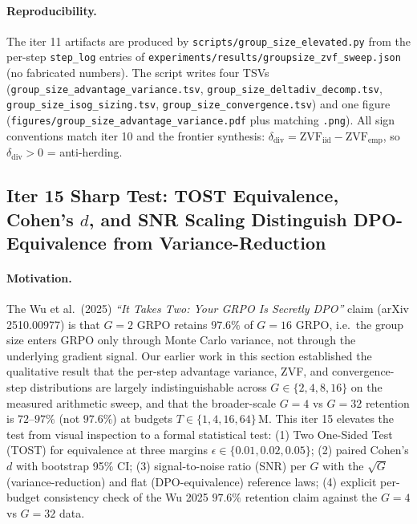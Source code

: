 \paragraph{Reproducibility.}
The iter 11 artifacts are produced by
\texttt{scripts/group\_size\_elevated.py} from the per-step
\texttt{step\_log} entries of
\texttt{experiments/results/groupsize\_zvf\_sweep.json} (no
fabricated numbers). The script writes four TSVs
(\texttt{group\_size\_advantage\_variance.tsv},
\texttt{group\_size\_deltadiv\_decomp.tsv},
\texttt{group\_size\_isog\_sizing.tsv},
\texttt{group\_size\_convergence.tsv}) and one figure
(\texttt{figures/group\_size\_advantage\_variance.pdf} plus matching
\texttt{.png}). All sign conventions match iter 10 and the frontier
synthesis: $\delta_\text{div} = \mathrm{ZVF}_\text{iid} -
\mathrm{ZVF}_\text{emp}$, so $\delta_\text{div} > 0$ = anti-herding.



\subsection{Iter 15 Sharp Test: TOST Equivalence, Cohen's $d$, and
SNR Scaling Distinguish DPO-Equivalence from Variance-Reduction}

\paragraph{Motivation.}
The Wu et al.\ (2025) \emph{``It Takes Two: Your GRPO Is Secretly DPO''}
claim (arXiv 2510.00977) is that $G{=}2$ GRPO retains $97.6\%$ of
$G{=}16$ GRPO, i.e.\ the group size enters GRPO only through Monte
Carlo variance, not through the underlying gradient signal. Our
earlier work in this section established the qualitative result that
the per-step advantage variance, ZVF, and convergence-step
distributions are largely indistinguishable across $G \in
\{2,4,8,16\}$ on the measured arithmetic sweep, and that the
broader-scale $G{=}4$ vs $G{=}32$ retention is $72$--$97\%$ (not
$97.6\%$) at budgets $T \in \{1,4,16,64\}$\,M. This iter 15 elevates
the test from visual inspection to a formal statistical test: (1)
Two One-Sided Test (TOST) for equivalence at three margins
$\epsilon \in \{0.01, 0.02, 0.05\}$; (2) paired Cohen's $d$ with
bootstrap 95\% CI; (3) signal-to-noise ratio (SNR) per $G$ with the
$\sqrt{G}$ (variance-reduction) and flat (DPO-equivalence) reference
laws; (4) explicit per-budget consistency check of the Wu 2025
$97.6\%$ retention claim against the $G{=}4$ vs $G{=}32$ data.

